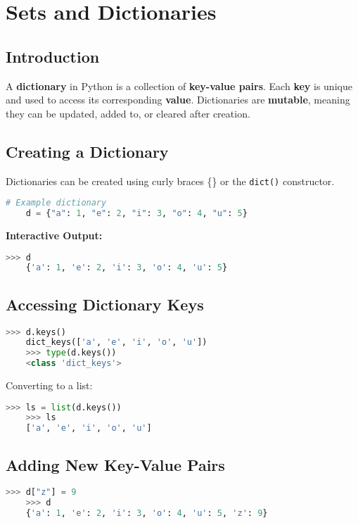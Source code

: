 \chapter{Sets and Dictionaries}

\section{Introduction}
A \textbf{dictionary} in Python is a collection of \textbf{key-value pairs}. 
Each \textbf{key} is unique and used to access its corresponding \textbf{value}. 
Dictionaries are \textbf{mutable}, meaning they can be updated, added to, or cleared after creation.

\section{Creating a Dictionary}
Dictionaries can be created using curly braces \{\} or the \texttt{dict()} constructor.

\begin{lstlisting}[language=Python]
	# Example dictionary
	d = {"a": 1, "e": 2, "i": 3, "o": 4, "u": 5}
\end{lstlisting}

\textbf{Interactive Output:}
\begin{lstlisting}[language=Python]
	>>> d
	{'a': 1, 'e': 2, 'i': 3, 'o': 4, 'u': 5}
\end{lstlisting}

\section{Accessing Dictionary Keys}
\begin{lstlisting}[language=Python]
	>>> d.keys()
	dict_keys(['a', 'e', 'i', 'o', 'u'])
	>>> type(d.keys())
	<class 'dict_keys'>
\end{lstlisting}

Converting to a list:
\begin{lstlisting}[language=Python]
	>>> ls = list(d.keys())
	>>> ls
	['a', 'e', 'i', 'o', 'u']
\end{lstlisting}

\section{Adding New Key-Value Pairs}
\begin{lstlisting}[language=Python]
	>>> d["z"] = 9
	>>> d
	{'a': 1, 'e': 2, 'i': 3, 'o': 4, 'u': 5, 'z': 9}
\end{lstlisting}

